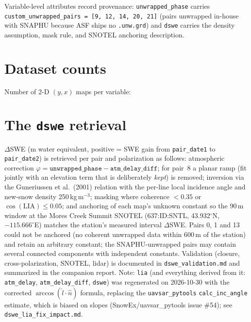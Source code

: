 \documentclass[11pt]{article}
\begin{document}
\noindent\resizebox{\textwidth}{!}{}

Variable-level attributes record provenance: \texttt{unwrapped\_phase} carries
\texttt{custom\_unwrapped\_pairs = [9, 12, 14, 20, 21]} (pairs unwrapped in-house with
SNAPHU because ASF ships no \texttt{.unw.grd}) and \texttt{dswe} carries the density
assumption, mask rule, and SNOTEL anchoring description.

\section{Dataset counts}

Number of 2-D $(y, x)$ maps per variable:

\medskip
\noindent

\section{The \texttt{dswe} retrieval}

$\Delta$SWE (m water equivalent, positive = SWE gain from \texttt{pair\_date1} to
\texttt{pair\_date2}) is retrieved per pair and polarization as follows: atmospheric
correction $\varphi = \texttt{unwrapped\_phase} - \texttt{atm\_delay\_diff}$; for pair~8 a
planar ramp (fit jointly with an elevation term that is deliberately \emph{kept}) is
removed; inversion via the Guneriussen et al.\ (2001) relation with the per-line local
incidence angle and new-snow density 250\,kg\,m$^{-3}$; masking where coherence $< 0.35$
or $\cos(\mathrm{LIA}) \le 0.05$; and anchoring of each map's unknown constant so the
90\,m window at the Mores Creek Summit SNOTEL (637:ID:SNTL, 43.932$^\circ$N,
$-115.666^\circ$E) matches the station's measured interval $\Delta$SWE. Pairs 0, 1 and 13
could not be anchored (no coherent unwrapped data within 600\,m of the station) and
retain an arbitrary constant; the SNAPHU-unwrapped pairs may contain several connected
components with independent constants. Validation (closure, cross-polarization, SNOTEL,
lidar) is documented in \texttt{dswe\_validation.md} and summarized in the companion
report. Note: \texttt{lia} (and everything derived from it: \texttt{atm\_delay},
\texttt{atm\_delay\_diff}, \texttt{dswe}) was regenerated on 2026-10-30 with the
corrected $\arccos(\hat{l}\cdot\hat{n})$ formula, replacing the
\texttt{uavsar\_pytools} \texttt{calc\_inc\_angle} estimate, which is biased on slopes
(SnowEx/uavsar\_pytools issue \#54); see \texttt{dswe\_lia\_fix\_impact.md}.
\end{document}
